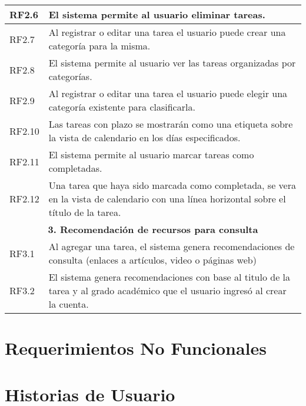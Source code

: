 \documentclass[11pt]{article}
\begin{document}
\begin{table}[H]
\begin{tabular}{|p{2cm}|p{13cm}|}
    \hline
    RF2.6 & El sistema permite al usuario eliminar tareas. \\
    \hline
    RF2.7 & Al registrar o editar una tarea el usuario puede crear una categoría para la misma.\\
    \hline
    RF2.8 & El sistema permite al usuario ver las tareas organizadas por categorías. \\
    \hline
    RF2.9 & Al registrar o editar una tarea el usuario puede elegir una categoría existente para clasificarla.\\
    \hline
    RF2.10 & Las tareas con plazo se mostrarán como una etiqueta sobre la vista de calendario en los días especificados.\\
    \hline
    RF2.11 & El sistema permite al usuario marcar tareas como completadas. \\
    \hline
    RF2.12 & Una tarea que haya sido marcada como completada, se vera en la vista de calendario con una línea horizontal sobre el título de la tarea.\\
    \hline
    \multicolumn{2}{|c|}{\textbf{3. Recomendación de recursos para consulta}} \\
    \hline
    RF3.1 & Al agregar una tarea, el sistema genera recomendaciones de consulta (enlaces a artículos, video o páginas web)  \\
    \hline
    RF3.2 & El sistema genera recomendaciones con base al titulo de la tarea y al grado académico que el usuario ingresó al crear la cuenta.\\   
    \hline
    
    \end{tabular}

    \label{tab:wumpus}
\end{table}
\section{Requerimientos No Funcionales}
\section{Historias de Usuario}

\pagebreak
\printbibliography[heading=bibintoc]
\end{document}
